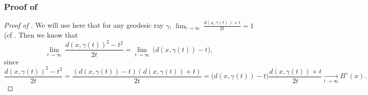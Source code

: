 \documentclass[twoside]{article}
\begin{document}
\subsubsection{Proof of } \label{proof:prop_closed_form_general_gaussian}

\begin{proof}[Proof of ]
    We will use here that for any geodesic ray $\gamma$, $\lim_{t\to\infty}\ \frac{d(x,\gamma(t))+t}{2t} = 1$ (cf \citep[II. 8.24]{bridson2013metric}. Then we know that 
    \begin{equation}
        \lim_{t\to \infty}\ \frac{d(x,\gamma(t))^2-t^2}{2t} = \lim_{t\to\infty}\ \big(d(x,\gamma(t))-t\big),
    \end{equation}
    since
    \begin{equation}
        \frac{d(x,\gamma(t))^2-t^2}{2t} = \frac{(d(x,\gamma(t))-t)(d(x,\gamma(t))+t)}{2t} = \big(d(x,\gamma(t))-t\big) \frac{d(x,\gamma(t))+t}{2t} \xrightarrow[t\to \infty]{} B^\gamma(x).
    \end{equation}


\end{proof}
\end{document}
